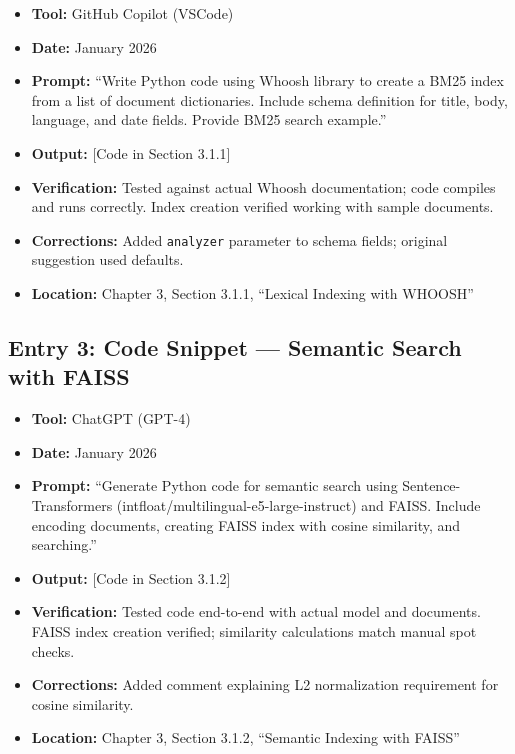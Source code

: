 \documentclass[12pt,a4paper]{report}
\begin{document}
\begin{itemize}
    \item \textbf{Tool:} GitHub Copilot (VSCode)
    \item \textbf{Date:} January 2026
    \item \textbf{Prompt:} ``Write Python code using Whoosh library to create a BM25 index from a list of document dictionaries. Include schema definition for title, body, language, and date fields. Provide BM25 search example.''
    \item \textbf{Output:} [Code in Section 3.1.1]
    \item \textbf{Verification:} Tested against actual Whoosh documentation; code compiles and runs correctly. Index creation verified working with sample documents.
    \item \textbf{Corrections:} Added \texttt{analyzer} parameter to schema fields; original suggestion used defaults.
    \item \textbf{Location:} Chapter 3, Section 3.1.1, ``Lexical Indexing with WHOOSH''
\end{itemize}

\subsection{Entry 3: Code Snippet --- Semantic Search with FAISS}

\begin{itemize}
    \item \textbf{Tool:} ChatGPT (GPT-4)
    \item \textbf{Date:} January 2026
    \item \textbf{Prompt:} ``Generate Python code for semantic search using Sentence-Transformers (intfloat/multilingual-e5-large-instruct) and FAISS. Include encoding documents, creating FAISS index with cosine similarity, and searching.''
    \item \textbf{Output:} [Code in Section 3.1.2]
    \item \textbf{Verification:} Tested code end-to-end with actual model and documents. FAISS index creation verified; similarity calculations match manual spot checks.
    \item \textbf{Corrections:} Added comment explaining L2 normalization requirement for cosine similarity.
    \item \textbf{Location:} Chapter 3, Section 3.1.2, ``Semantic Indexing with FAISS''
\end{itemize}
\end{document}
